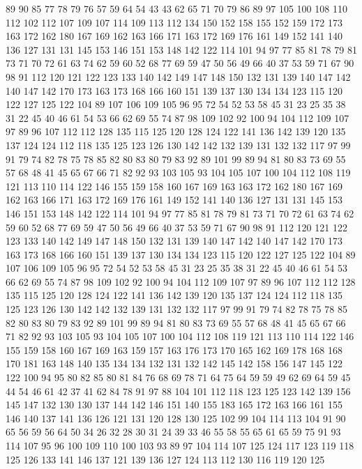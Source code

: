 89 90 85 77 78 79 76 57 59 64 54 43 43 62 65 71 70 79 86 89
97 105 100 108 110 112 102 112 107 109 107 114 109 113 112 134 150 152 158 155
152 159 172 173 163 172 162 180 167 169 162 163 166 171 163 172 169 176 161 149
152 141 140 136 127 131 131 145 153 146 151 153 148 142 122 114 101 94 97 77
85 81 78 79 81 73 71 70 72 61 63 74 62 59 60 52 68 77 69 59
47 50 56 49 66 40 37 53 59 71 67 90 98 91 112 120 121 122 123 133
140 142 149 147 148 150 132 131 139 140 147 142 140 147 142 170 173 163 173 168
166 160 151 139 137 130 134 134 123 115 120 122 127 125 122 104 89 107 106 109
105 96 95 72 54 52 53 58 45 31 23 25 35 38 31 22 45 40 46 61
54 53 66 62 69 55 74 87 98 109 102 92 100 94 104 112 109 107 97 89
96 107 112 112 128 135 115 125 120 128 124 122 141 136 142 139 120 135 137 124
124 112 118 135 125 123 126 130 142 142 132 139 131 132 132 117 97 99 91 79
74 82 78 75 78 85 82 80 83 80 79 83 92 89 101 99 89 94 81 80
83 73 69 55 57 68 48 41 45 65 67 66 71 82 92 93 103 105 93 104
105 107 100 104 112 108 119 121 113 110 114 122 146 155 159 158 160 167 169 163
163 172 162 180 167 169 162 163 166 171 163 172 169 176 161 149 152 141 140 136
127 131 131 145 153 146 151 153 148 142 122 114 101 94 97 77 85 81 78 79
81 73 71 70 72 61 63 74 62 59 60 52 68 77 69 59 47 50 56 49
66 40 37 53 59 71 67 90 98 91 112 120 121 122 123 133 140 142 149 147
148 150 132 131 139 140 147 142 140 147 142 170 173 163 173 168 166 160 151 139
137 130 134 134 123 115 120 122 127 125 122 104 89 107 106 109 105 96 95 72
54 52 53 58 45 31 23 25 35 38 31 22 45 40 46 61 54 53 66 62
69 55 74 87 98 109 102 92 100 94 104 112 109 107 97 89 96 107 112 112
128 135 115 125 120 128 124 122 141 136 142 139 120 135 137 124 124 112 118 135
125 123 126 130 142 142 132 139 131 132 132 117 97 99 91 79 74 82 78 75
78 85 82 80 83 80 79 83 92 89 101 99 89 94 81 80 83 73 69 55
57 68 48 41 45 65 67 66 71 82 92 93 103 105 93 104 105 107 100 104
112 108 119 121 113 110 114 122 146 155 159 158 160 167 169 163 159 157 163 176
173 170 165 162 169 178 168 168 170 181 163 148 140 135 134 134 132 131 132 142
145 142 158 156 147 145 122 122 100 94 95 80 82 85 80 81 84 76 68 69
78 71 64 75 64 59 59 49 62 69 64 59 45 44 54 46 61 42 37 41
62 84 78 91 97 88 104 101 112 118 123 125 123 142 139 156 145 147 132 130
130 137 144 142 146 151 140 155 183 165 172 163 166 161 155 146 140 137 141 136
126 121 131 120 128 130 125 102 99 104 114 113 104 91 90 65 56 59 56 64
50 34 26 32 28 30 31 24 39 33 46 55 58 55 65 61 65 59 75 91
93 114 107 95 96 100 109 110 100 103 93 89 97 104 114 107 125 124 117 123
119 118 125 126 133 141 146 137 121 139 136 127 124 113 112 130 116 119 120 125
